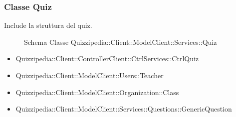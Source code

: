 \subsubsection{Classe Quiz}
Include la struttura del quiz.
\begin{figure}[H]
\centering
\noindent{}
\caption{Schema Classe Quizzipedia::Client::ModelClient::Services::Quiz}
\end{figure}
\begin{itemize}
\item Quizzipedia::Client::ControllerClient::CtrlServices::CtrlQuiz
\item Quizzipedia::Client::ModelClient::Users::Teacher
\end{itemize}
\begin{itemize}
\item Quizzipedia::Client::ModelClient::Organization::Class
\item Quizzipedia::Client::ModelClient::Services::Questions::GenericQuestion
\end{itemize}
